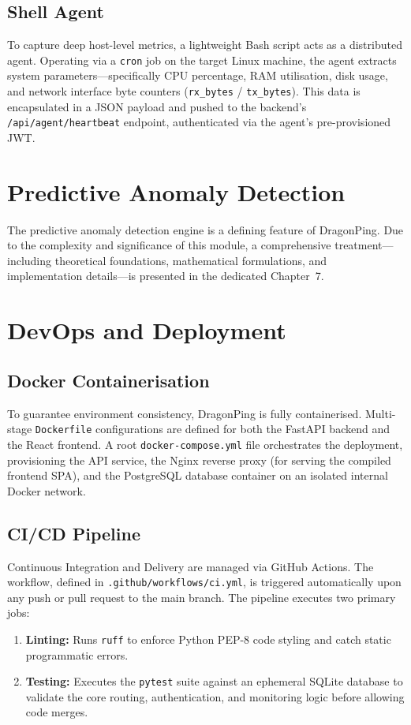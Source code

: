 \documentclass[12pt,a4paper,oneside]{report}
\begin{document}
\subsection{Shell Agent}
\noindent To capture deep host-level metrics, a lightweight Bash script acts as a distributed agent. Operating via a \texttt{cron} job on the target Linux machine, the agent extracts system parameters---specifically CPU percentage, RAM utilisation, disk usage, and network interface byte counters (\texttt{rx\_bytes} / \texttt{tx\_bytes}). This data is encapsulated in a JSON payload and pushed to the backend's \texttt{/api/agent/heartbeat} endpoint, authenticated via the agent's pre-provisioned JWT.

\section{Predictive Anomaly Detection}
\noindent The predictive anomaly detection engine is a defining feature of DragonPing. Due to the complexity and significance of this module, a comprehensive treatment---including theoretical foundations, mathematical formulations, and implementation details---is presented in the dedicated Chapter~7.

\section{DevOps and Deployment}

\subsection{Docker Containerisation}
\noindent To guarantee environment consistency, DragonPing is fully containerised. Multi-stage \texttt{Dockerfile} configurations are defined for both the FastAPI backend and the React frontend. A root \texttt{docker-compose.yml} file orchestrates the deployment, provisioning the API service, the Nginx reverse proxy (for serving the compiled frontend SPA), and the PostgreSQL database container on an isolated internal Docker network.

\subsection{CI/CD Pipeline}
\noindent Continuous Integration and Delivery are managed via GitHub Actions. The workflow, defined in \texttt{.github/workflows/ci.yml}, is triggered automatically upon any push or pull request to the main branch. The pipeline executes two primary jobs:
\begin{enumerate}
    \item \textbf{Linting:} Runs \texttt{ruff} to enforce Python PEP-8 code styling and catch static programmatic errors.
    \item \textbf{Testing:} Executes the \texttt{pytest} suite against an ephemeral SQLite database to validate the core routing, authentication, and monitoring logic before allowing code merges.
\end{enumerate}
\end{document}
